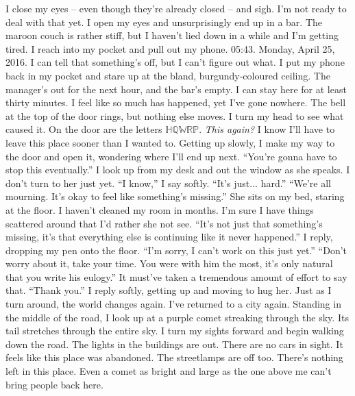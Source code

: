 \documentclass[a4paper, 12pt]{book}
\newcommand\tab[1][1cm]{\hspace*{#1}}
\begin{document}
\newline
\tab
I close my eyes -- even though they’re already closed -- and sigh. I’m not ready to deal with that yet. I open my eyes and unsurprisingly end up in a bar. The maroon couch is rather stiff, but I haven’t lied down in a while and I’m getting tired. I reach into my pocket and pull out my phone.  05:43. Monday, April 25, 2016. I can tell that something’s off, but I can’t figure out what. I put my phone back in my pocket and stare up at the bland, burgundy-coloured ceiling. The manager’s out for the next hour, and the bar’s empty. I can stay here for at least thirty minutes. I feel like so much has happened, yet I’ve gone nowhere. The bell at the top of the door rings, but nothing else moves. I turn my head to see what caused it. On the door are the letters $\mathbb{HQWRP}$. \textit{This again?} I know I’ll have to leave this place sooner than I wanted to. Getting up slowly, I make my way to the door and open it, wondering where I’ll end up next.
\newline
\tab
``You’re gonna have to stop this eventually.'' I look up from my desk and out the window as she speaks. I don’t turn to her just yet.
\newline
\tab
``I know,'' I say softly. ``It’s just... hard.''
\newline
\tab
``We’re all mourning. It’s okay to feel like something’s missing.'' She sits on my bed, staring at the floor. I haven’t cleaned my room in months. I’m sure I have things scattered around that I’d rather she not see.
\newline
\tab
``It’s not just that something’s missing, it’s that everything else is continuing like it never happened.'' I reply, dropping my pen onto the floor. ``I’m sorry, I can’t work on this just yet.''
\newline
\tab
``Don’t worry about it, take your time. You were with him the most, it’s only natural that you write his eulogy.'' It must’ve taken a tremendous amount of effort to say that.
\newline
\tab
``Thank you.'' I reply softly, getting up and moving to hug her. Just as I turn around, the world changes again. 
\newline
\tab
I’ve returned to a city again. Standing in the middle of the road, I look up at a purple comet streaking through the sky. Its tail stretches through the entire sky. I turn my sights forward and begin walking down the road. The lights in the buildings are out. There are no cars in sight. It feels like this place was abandoned. The streetlamps are off too. There’s nothing left in this place. Even a comet as bright and large as the one above me can’t bring people back here.
\end{document}
